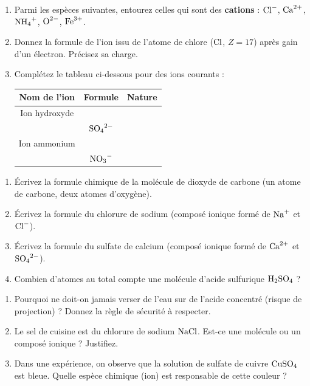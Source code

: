 \documentclass[11pt]{article}
\begin{document}
\begin{exercice}
\begin{enumerate}
    \item Parmi les espèces suivantes, entourez celles qui sont des \textbf{cations} : $\ce{Cl-}$, $\ce{Ca^2+}$, $\ce{NH4+}$, $\ce{O^2-}$, $\ce{Fe^3+}$.
    \item Donnez la formule de l'ion issu de l'atome de chlore ($\ce{Cl}$, $Z=17$) après gain d'un électron. Précisez sa charge.
    \item Complétez le tableau ci-dessous pour des ions courants :
    \begin{tabular}{|c|c|c|}
        \hline
        \textbf{Nom de l'ion} & \textbf{Formule} & \textbf{Nature} \\
        \hline
        Ion hydroxyde & & \\
        \hline
        & $\ce{SO4^2-}$ & \\
        \hline
        Ion ammonium & & \\
        \hline
        & $\ce{NO3-}$ & \\
        \hline
    \end{tabular}
\end{enumerate}
\end{exercice}

\begin{exercice}
\begin{enumerate}
    \item Écrivez la formule chimique de la molécule de dioxyde de carbone (un atome de carbone, deux atomes d'oxygène).
    \item Écrivez la formule du chlorure de sodium (composé ionique formé de $\ce{Na+}$ et $\ce{Cl-}$).
    \item Écrivez la formule du sulfate de calcium (composé ionique formé de $\ce{Ca^2+}$ et $\ce{SO4^2-}$).
    \item Combien d'atomes au total compte une molécule d'acide sulfurique $\ce{H2SO4}$ ?
\end{enumerate}
\end{exercice}

\begin{exercice}
\begin{enumerate}
    \item Pourquoi ne doit-on jamais verser de l'eau sur de l'acide concentré (risque de projection) ? Donnez la règle de sécurité à respecter.
    \item Le sel de cuisine est du chlorure de sodium $\ce{NaCl}$. Est-ce une molécule ou un composé ionique ? Justifiez.
    \item Dans une expérience, on observe que la solution de sulfate de cuivre $\ce{CuSO4}$ est bleue. Quelle espèce chimique (ion) est responsable de cette couleur ?
\end{enumerate}
\end{exercice}
\end{document}
